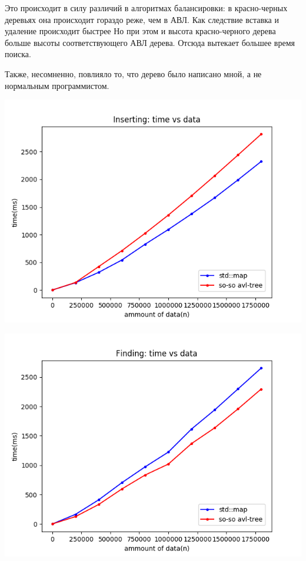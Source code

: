 \documentclass[12pt]{article}
\begin{document}
Это происходит в силу различий в алгоритмах балансировки: в красно-черных деревьях она происходит гораздо реже, чем в АВЛ. Как следствие вставка и удаление происходит быстрее Но при этом и высота красно-черного дерева больше высоты соответствующего АВЛ дерева. Отсюда вытекает большее время поиска.

Также, несомненно, повлияло то, что дерево было написано мной, а не нормальным программистом.
\begin{center}
    \includegraphics[width=\linewidth]{insert.png}
\end{center}
\begin{center}
    \includegraphics[width=\linewidth]{find.png}
\end{center}
\end{document}
